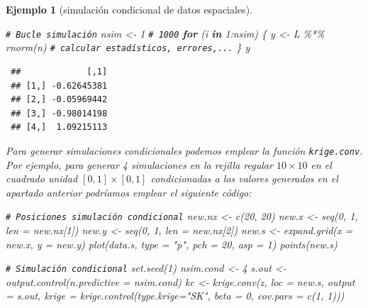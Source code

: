 \documentclass[
]{book}
\newenvironment{Shaded}{\begin{snugshade}}{\end{snugshade}}
\newcommand{\AttributeTok}[1]{\textcolor[rgb]{0.77,0.63,0.00}{#1}}
\newcommand{\CommentTok}[1]{\textcolor[rgb]{0.56,0.35,0.01}{\textit{#1}}}
\newcommand{\ControlFlowTok}[1]{\textcolor[rgb]{0.13,0.29,0.53}{\textbf{#1}}}
\newcommand{\DecValTok}[1]{\textcolor[rgb]{0.00,0.00,0.81}{#1}}
\newcommand{\FunctionTok}[1]{\textcolor[rgb]{0.00,0.00,0.00}{#1}}
\newcommand{\NormalTok}[1]{#1}
\newcommand{\OtherTok}[1]{\textcolor[rgb]{0.56,0.35,0.01}{#1}}
\newcommand{\SpecialCharTok}[1]{\textcolor[rgb]{0.00,0.00,0.00}{#1}}
\newcommand{\StringTok}[1]{\textcolor[rgb]{0.31,0.60,0.02}{#1}}
\theoremstyle{break}
\newtheorem{example}{Ejemplo}[chapter]
\theoremstyle{nonumberplain}
\renewcommand{\CommentTok}[1]{\textcolor[rgb]{0.41,0.41,0.41}{\texttt{#1}}}
\begin{document}
\begin{example}[simulación condicional de datos espaciales]
\begin{Shaded}
\begin{Highlighting}[]
\CommentTok{\# Bucle simulación}
\NormalTok{nsim }\OtherTok{\textless{}{-}} \DecValTok{1} \CommentTok{\# 1000}
\ControlFlowTok{for}\NormalTok{ (i }\ControlFlowTok{in} \DecValTok{1}\SpecialCharTok{:}\NormalTok{nsim) \{}
\NormalTok{  y }\OtherTok{\textless{}{-}}\NormalTok{ L }\SpecialCharTok{\%*\%} \FunctionTok{rnorm}\NormalTok{(n)}
  \CommentTok{\# calcular estadísticos, errores,...}
\NormalTok{\}}
\NormalTok{y}
\end{Highlighting}
\end{Shaded}

\begin{verbatim}
 ##             [,1]
 ## [1,] -0.62645381
 ## [2,] -0.05969442
 ## [3,] -0.98014198
 ## [4,]  1.09215113
\end{verbatim}

Para generar simulaciones condicionales podemos emplear la función \texttt{krige.conv}.
Por ejemplo, para generar 4 simulaciones en la rejilla regular \(10\times10\) en el cuadrado unidad \([0,1] \times [0,1]\) condicionadas a los valores generados en el apartado anterior podríamos emplear el siguiente código:

\begin{Shaded}
\begin{Highlighting}[]
\CommentTok{\# Posiciones simulación condicional}
\NormalTok{new.nx }\OtherTok{\textless{}{-}} \FunctionTok{c}\NormalTok{(}\DecValTok{20}\NormalTok{, }\DecValTok{20}\NormalTok{)}
\NormalTok{new.x }\OtherTok{\textless{}{-}} \FunctionTok{seq}\NormalTok{(}\DecValTok{0}\NormalTok{, }\DecValTok{1}\NormalTok{, }\AttributeTok{len =}\NormalTok{ new.nx[}\DecValTok{1}\NormalTok{])}
\NormalTok{new.y }\OtherTok{\textless{}{-}} \FunctionTok{seq}\NormalTok{(}\DecValTok{0}\NormalTok{, }\DecValTok{1}\NormalTok{, }\AttributeTok{len =}\NormalTok{ new.nx[}\DecValTok{2}\NormalTok{])}
\NormalTok{new.s }\OtherTok{\textless{}{-}} \FunctionTok{expand.grid}\NormalTok{(}\AttributeTok{x =}\NormalTok{ new.x, }\AttributeTok{y =}\NormalTok{ new.y)}
\FunctionTok{plot}\NormalTok{(data.s, }\AttributeTok{type =} \StringTok{"p"}\NormalTok{, }\AttributeTok{pch =} \DecValTok{20}\NormalTok{, }\AttributeTok{asp =} \DecValTok{1}\NormalTok{)}
\FunctionTok{points}\NormalTok{(new.s)}

\CommentTok{\# Simulación condicional}
\FunctionTok{set.seed}\NormalTok{(}\DecValTok{1}\NormalTok{)}
\NormalTok{nsim.cond }\OtherTok{\textless{}{-}} \DecValTok{4}
\NormalTok{s.out }\OtherTok{\textless{}{-}} \FunctionTok{output.control}\NormalTok{(}\AttributeTok{n.predictive =}\NormalTok{ nsim.cond)}
\NormalTok{kc }\OtherTok{\textless{}{-}} \FunctionTok{krige.conv}\NormalTok{(z, }\AttributeTok{loc =}\NormalTok{ new.s, }\AttributeTok{output =}\NormalTok{ s.out,}
            \AttributeTok{krige =} \FunctionTok{krige.control}\NormalTok{(}\AttributeTok{type.krige=}\StringTok{"SK"}\NormalTok{, }\AttributeTok{beta =} \DecValTok{0}\NormalTok{, }\AttributeTok{cov.pars =} \FunctionTok{c}\NormalTok{(}\DecValTok{1}\NormalTok{, }\DecValTok{1}\NormalTok{)))}
\end{Highlighting}
\end{Shaded}


\end{example}
\end{document}
